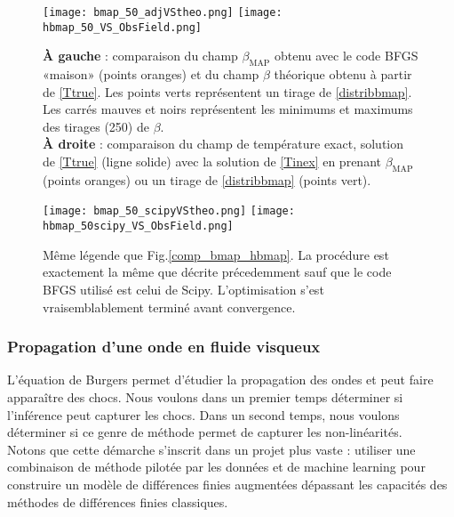 \documentclass[a4paper,12pt]{article}
\newcommand{\bmap}{\beta_{\text{MAP}}}
\newcommand\bk{\color{black}}
\newcommand\dsb{\color{dsb}}
\numberwithin{equation}{section} %
\begin{document}
\begin{figure}[!ht]
\centering
\texttt{[image: bmap\_50\_adjVStheo.png]} \hfill
\texttt{[image: hbmap\_50\_VS\_ObsField.png]}
\caption{\small{\textbf{À gauche} : comparaison du champ $\bmap$ obtenu avec le code BFGS «maison» (points oranges) et du champ $\beta$ théorique obtenu à partir de \eqref{Ttrue}. Les points verts représentent un tirage de \eqref{distribbmap}. Les carrés mauves et noirs représentent les minimums et maximums des tirages (250) de $\beta$. \\ \textbf{À droite} : comparaison du champ de température exact, solution de \eqref{Ttrue} (ligne solide) avec la solution de \eqref{Tinex} en prenant $\bmap$ (points oranges) ou un tirage de \eqref{distribbmap} (points vert).}}
\label{comp_bmap_hbmap}
\end{figure}

\begin{figure}[!ht]
\centering
\texttt{[image: bmap\_50\_scipyVStheo.png]} \hfill
\texttt{[image: hbmap\_50scipy\_VS\_ObsField.png]}
\caption{\small{Même légende que Fig.\eqref{comp_bmap_hbmap}. La procédure est exactement la même que décrite précedemment sauf que le code BFGS utilisé est celui de Scipy. L'optimisation s'est vraisemblablement terminé avant convergence.}}
\label{scipycomp_bmap_hbmap}
\end{figure}

\dsb \subsubsection{Propagation d'une onde en fluide visqueux} \bk
\noindent L'équation de Burgers permet d'étudier la propagation des ondes et peut faire apparaître des chocs. Nous voulons dans un premier temps déterminer si l'inférence peut capturer les chocs. Dans un second temps, nous voulons déterminer si ce genre de méthode permet de capturer les non-linéarités. \\
Notons que cette démarche s'inscrit dans un projet plus vaste : utiliser une combinaison de méthode pilotée par les données et de machine learning pour construire un modèle de différences finies augmentées dépassant les capacités des méthodes de différences finies classiques.\\
\end{document}
